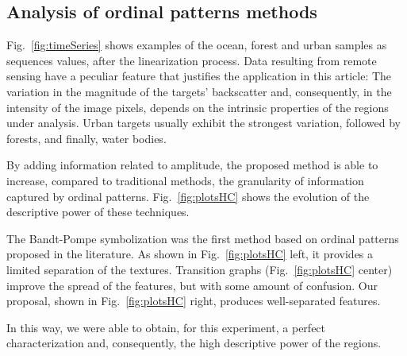 \documentclass[journal]{IEEEtran}
\begin{document}
	\subsection{Analysis of ordinal patterns methods}
	
	Fig.~\ref{fig:timeSeries} shows examples of the ocean, forest and urban samples as sequences values, after the linearization process.
	Data resulting from remote sensing have a peculiar feature that justifies the application in this article:
	The variation in the magnitude of the targets' backscatter and, consequently, in the intensity of the image pixels, depends on the intrinsic properties of the regions under analysis.
	Urban targets usually exhibit the strongest variation, followed by forests, and finally, water bodies.
	
	By adding information related to amplitude, the proposed method is able to increase, compared to traditional methods, the granularity of information captured by ordinal patterns.
	Fig.~\ref{fig:plotsHC} shows the evolution of the descriptive power of these techniques.
	
	The Bandt-Pompe symbolization was the first method based on ordinal patterns proposed in the literature.
	As shown in Fig.~\ref{fig:plotsHC} left, it provides a limited separation of the textures.
	Transition graphs (Fig.~\ref{fig:plotsHC} center) improve the spread of the features, but with some amount of confusion.
	Our proposal, shown in Fig.~\ref{fig:plotsHC} right, produces well-separated features.
	
	
	In this way, we were able to obtain, for this experiment, a perfect characterization and, consequently, the high descriptive power of the regions.
	
\end{document}
